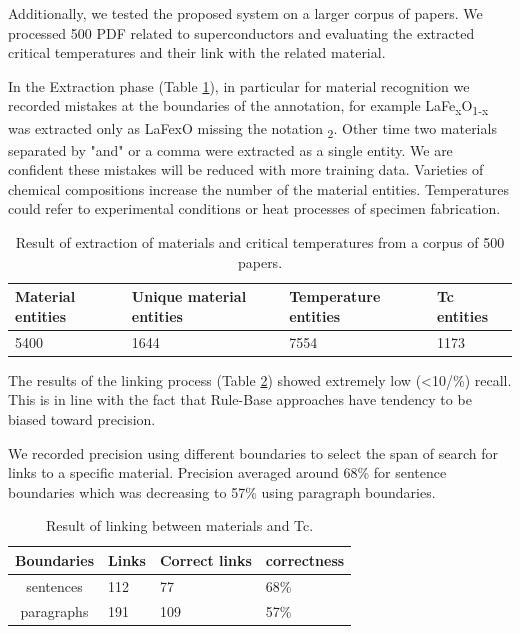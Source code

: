 \documentclass{article}[a4]
\begin{document}
Additionally, we tested the proposed system on a larger corpus of papers. We processed 500 PDF related to superconductors and evaluating the extracted critical temperatures and their link with the related material. 

In the Extraction phase (Table \ref{table:result-extraction}), in particular for material recognition we recorded mistakes at the boundaries of the annotation, for example LaFe\textsubscript{x}O\textsubscript{1-x} was extracted only as LaFexO missing the notation \textsubscript{2}. Other time two materials separated by "and" or a comma were extracted as a single entity. We are confident these mistakes will be reduced with more training data. Varieties of chemical compositions increase the number of the material entities. Temperatures could refer to experimental conditions or heat processes of specimen fabrication.

\begin{table}[h!]
    \centering
    \begin{tabular}{ | m{4em} | m{4em} | m{6em} | m{5em} | } 
    \hline
        Material entities & Unique material entities & Temperature entities & Tc entities \\
    \hline
        5400 & 1644 & 7554 & 1173 \\ 
    \hline
    \end{tabular}
    \label{table:result-extraction}
    \caption{Result of extraction of materials and critical temperatures from a corpus of 500 papers.}    
\end{table}

The results of the linking process (Table  \ref{table:result-linking}) showed extremely low (\textless 10/\%) recall. This is in line with the fact that Rule-Base approaches have tendency to be biased toward precision. 

We recorded precision using different boundaries to select the span of search for links to a specific material. Precision averaged around 68\% for sentence boundaries which was decreasing to 57\% using paragraph boundaries. 

\begin{table}[h!]
    \centering
    \begin{tabular}{ | c | m{5em}| m{5em}| m{5em}| } 
    \hline
        Boundaries & Links & Correct links & correctness  \\
    \hline
            sentences  & 112 & 77 & 68\% \\
    \hline
            paragraphs & 191 & 109 & 57\% \\
    \hline
    \end{tabular}
    \label{table:result-linking}
    \caption{Result of linking between materials and Tc.}    
\end{table}
\end{document}
